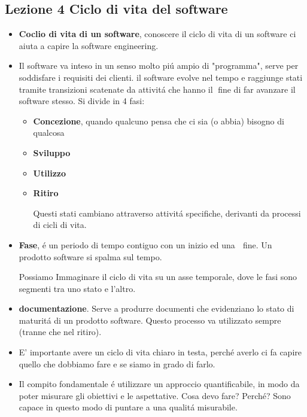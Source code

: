 \documentclass[a4paper,10pt] {article}
\begin{document}
\begin{itemize}
\section{Lezione 4 Ciclo di vita del software}
\begin{itemize}
	\item \textbf{Coclio di vita di un software}, conoscere il ciclo di vita di 
	un software ci aiuta a capire la software engineering. 
	
	
	
	\item Il software va inteso in un senso molto pi\'u ampio di "programma", 
	serve per soddisfare i requisiti dei clienti. il software evolve
	nel tempo e raggiunge stati tramite transizioni scatenate da attivit\'a che 
	hanno il fine di far avanzare il software stesso. Si divide in 4 fasi:
	\begin{itemize}
	\item \textbf{Concezione}, quando qualcuno pensa che ci sia (o abbia) 
	bisogno di qualcosa
	\item \textbf{Sviluppo}
	\item \textbf{Utilizzo}
	\item \textbf{Ritiro}
	
	Questi stati cambiano attraverso attivit\'a specifiche, derivanti da 
	processi di cicli di vita.
	
	\end{itemize}

	\item \textbf{Fase}, \'e un periodo di tempo contiguo con un inizio ed una 
	fine. Un prodotto software si spalma sul tempo.
	
	Possiamo Immaginare il ciclo di vita su un asse temporale, dove le fasi 
	sono segmenti tra uno stato e l'altro.
	
	\item \textbf{documentazione}. Serve a produrre documenti che evidenziano 
	lo stato di maturit\'a di un prodotto software. Questo processo va 
	utilizzato sempre (tranne che nel ritiro).
	
	\item E' importante avere un ciclo di vita chiaro in testa, perch\'e averlo 
	ci fa capire quello che dobbiamo fare e se siamo in grado di farlo. 
	
	\item Il compito fondamentale \'e utilizzare un approccio 
	quantificabile, in modo da poter misurare gli obiettivi e le aspettative. 
	Cosa devo fare? 
	Perch\'e? 
	Sono capace in questo modo di puntare a una qualit\'a misurabile.
	

\end{itemize}
\end{itemize}
\end{document}
